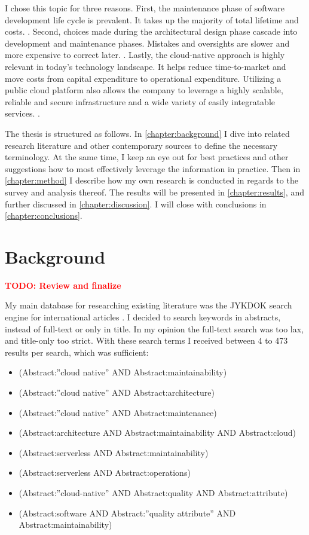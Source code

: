 \documentclass[utf8,english]{gradu3}
\newcommand{\todo}[1]{\textbf{\textcolor{red}{#1}}}
\begin{document}
I chose this topic for three reasons. First, the maintenance phase of software
development life cycle is prevalent. It takes up the majority of total lifetime
and costs. \parencite{Bass1998}. Second, choices made during the architectural
design phase cascade into development and maintenance phases. Mistakes and
oversights are slower and more expensive to correct later.
\parencites{Bass1998}{Mumtaz2021}. Lastly, the cloud-native approach is highly
relevant in today's technology landscape. It helps reduce time-to-market and
move costs from capital expenditure to operational expenditure. Utilizing a
public cloud platform also allows the company to leverage a highly scalable,
reliable and secure infrastructure and a wide variety of easily integratable
services. \parencite{Microsoft2022-CNA}.

The thesis is structured as follows. In \autoref{chapter:background} I dive into
related research literature and other contemporary sources to define the
necessary terminology. At the same time, I keep an eye out for best practices
and other suggestions how to most effectively leverage the information in
practice.  Then in \autoref{chapter:method} I describe how my own research is
conducted in regards to the survey and analysis thereof.  The results will be
presented in \autoref{chapter:results}, and further discussed in
\autoref{chapter:discussion}. I will close with conclusions in
\autoref{chapter:conclusions}.


\chapter{Background}
\label{chapter:background}

\todo{TODO: Review and finalize}

My main database for researching existing literature was the JYKDOK search
engine for international articles \parencite{JYKDOK}.
I decided to search keywords in abstracts, instead of full-text or only in title.
In my opinion the full-text search was too lax, and title-only too strict.
With these search terms I received between 4 to 473 results per search, which
was sufficient:
\begin{itemize}
  \item (Abstract:''cloud native'' AND Abstract:maintainability)
  \item (Abstract:''cloud native'' AND Abstract:architecture)
  \item (Abstract:''cloud native'' AND Abstract:maintenance)
  \item (Abstract:architecture AND Abstract:maintainability AND Abstract:cloud)
  \item (Abstract:serverless AND Abstract:maintainability)
  \item (Abstract:serverless AND Abstract:operations)
  \item (Abstract:''cloud-native'' AND Abstract:quality AND Abstract:attribute)
  \item (Abstract:software AND Abstract:''quality attribute'' AND Abstract:maintainability)
\end{itemize}
\end{document}

